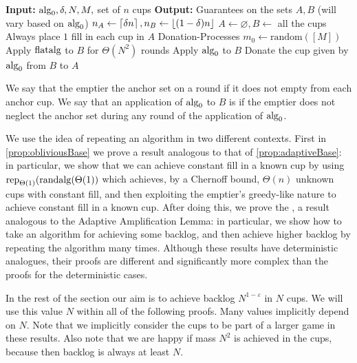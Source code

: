 \begin{definition}
\begin{algorithm}
  \caption{$\rep_\delta(\alg_0)$}
  \label{alg:rep}
  \begin{algorithmic}
    \State \textbf{Input:} $\operatorname{\text{\textup{alg}}}_0, \delta, N, M, $ set of $n$ cups
    \State \textbf{Output:} Guarantees on the sets $A, B$ (will vary based on $\operatorname{\text{\textup{alg}}}_0$)
    \State
    \State $n_A \gets \left\lceil \delta n \right\rceil, n_B \gets \left\lfloor (1-\delta) n \right\rfloor$
    \State $A \gets \varnothing, B \gets$ all the cups
    \State Always place $1$ fill in each cup in $A$
     \Comment Donation-Processes
    \State $m_0 \gets \text{random}([M])$
        \State Apply $\operatorname{\text{\textup{flatalg}}}$ to $B$ for $\Theta(N^2)$ rounds
        \State Apply $\operatorname{\text{\textup{alg}}}_0$ to $B$
      \EndFor
      \State Donate the cup given by $\operatorname{\text{\textup{alg}}}_0$ from $B$ to $A$
    \EndFor
  \end{algorithmic}
\end{algorithm}

{\normalfont
We say that the emptier  the anchor set on a round
if it does not empty from each anchor cup. We say that an
application of $\operatorname{\text{\textup{alg}}}_0$ to $B$ is  if
the emptier does not neglect the anchor set during any round of
the application of $\operatorname{\text{\textup{alg}}}_0$.
}
\end{definition}

We use the idea of repeating an algorithm in two different contexts.
First in \cref{prop:obliviousBase} we prove a result analogous to that of
\cref{prop:adaptiveBase}: in particular, we show that we can
achieve constant fill in a known cup by using
$\operatorname{\text{\textup{rep}}}_{\Theta(1)}(\operatorname{\text{\textup{randalg}}}(\Theta(1))$
which achieves, by a Chernoff bound, $\Theta(n)$ unknown cups
with constant fill, and then exploiting the emptier's greedy-like
nature to achieve constant fill in a known cup.
After doing this, we prove the , a result analogous to the Adaptive
Amplification Lemma: in particular, we show how to take an
algorithm for achieving some backlog, and then achieve higher
backlog by repeating the algorithm many times.
Although these results have deterministic analogues, their proofs
are different and significantly more complex than the proofs for the
deterministic cases.

In the rest of the section our aim is to achieve backlog
$N^{1-\varepsilon}$ in $N$ cups. We will use this value $N$
within all of the following proofs. Many values implicitly depend
on $N$. Note that we implicitly consider the cups to be part of a
larger game in these results. Also note that we are happy if
mass $N^2$ is achieved in the cups, because then backlog is
always at least $N$.

